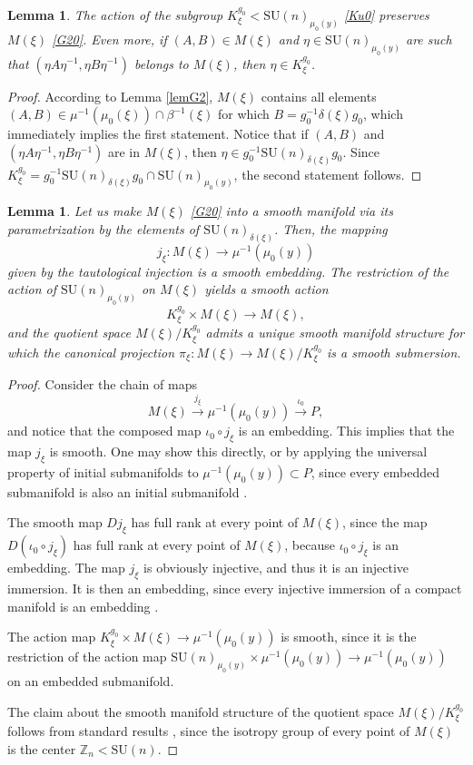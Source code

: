\documentclass[a4paper,11pt,reqno]{amsart}
\newtheorem{lem}[thm]{Lemma}
\theoremstyle{definition}
\numberwithin{equation}{section}
\newcommand{\be}{\begin{equation}}
\newcommand{\ee}{\end{equation}}
\def\bZ{{\mathbb Z}}                        %
\def\SU{\mathrm{SU}}                        %
\begin{document}
\begin{lem}\label{lemG8}
The action of the subgroup $K^{g_0}_\xi < \SU(n)_{\mu_0(y)}$ \eqref{Ku0} preserves $M(\xi)$ \eqref{G20}.
Even more, if $(A,B)\in M(\xi)$ and $\eta \in \SU(n)_{\mu_0(y)}$  are such that
$(\eta A \eta^{-1}, \eta B \eta^{-1})$ belongs to $M(\xi)$, then $\eta\in  K^{g_0}_\xi$.
\end{lem}
\begin{proof}
According to Lemma \ref{lemG2}, $M(\xi)$ contains all elements $(A,B) \in \mu^{-1} (\mu_0(\xi)) \cap \beta^{-1}(\xi)$
for which $B = g_0^{-1} \delta(\xi) g_0$, which immediately implies the first statement.
Notice that if $(A,B)$ and $ (\eta A\eta^{-1} ,\eta  B \eta^{-1})$ are in  $M(\xi)$,
then $\eta \in g_0^{-1} \SU(n)_{\delta(\xi)} g_0$.
Since $K_\xi^{g_0} = g_0^{-1} \SU(n)_{\delta (\xi)} g_0 \cap  \SU(n)_{\mu_0(y)}$, the second statement follows.
\end{proof}


\begin{lem}
Let us make $M(\xi)$ \eqref{G20} into a smooth manifold via its parametrization by the elements of $\SU(n)_{\delta(\xi)}$.
Then, the mapping
\be
j_\xi: M(\xi) \to \mu^{-1}(\mu_0(y))
\label{B4}\ee
given by the tautological injection is a smooth embedding. The restriction of the action of $\SU(n)_{\mu_0(y)}$ on $M(\xi)$
yields  a smooth action
\be
K_\xi^{g_0} \times M(\xi) \to M(\xi),
\label{B7}\ee
and the quotient space
$M(\xi)/K_\xi^{g_0}$ admits a unique smooth manifold structure for which the canonical projection
$\pi_\xi: M(\xi) \to M(\xi)/K_\xi^{g_0}$ is a smooth submersion.
\end{lem}
\begin{proof}
Consider the chain of maps
\be
M(\xi) \overset{j_\xi}{\longrightarrow} \mu^{-1}(\mu_0(y)) \overset{\iota_0}{\longrightarrow} P,
\label{B5}\ee
and notice that the composed map $\iota_0 \circ j_\xi$ is an embedding.
This implies that the map $j_\xi$ is smooth.
One may show this directly, or by applying the universal property of initial submanifolds to $\mu^{-1}(\mu_0(y)) \subset P$,
 since every embedded submanifold is also an initial  submanifold \cite{OR}.

The smooth map $D j_\xi$ has full rank at every point of $M(\xi)$, since the map $D (\iota_0 \circ j_\xi)$ has full rank
at every point of $M(\xi)$,  because $\iota_0 \circ j_\xi$ is an embedding.
The map $j_\xi$ is obviously injective, and thus it is an injective immersion.
It is then an embedding, since every injective immersion of a compact manifold is an embedding \cite{L}.

The action map $K_\xi^{g_0} \times M(\xi) \to \mu^{-1}(\mu_0(y))$ is smooth, since it is the
restriction of the action map $\SU(n)_{\mu_0(y)} \times \mu^{-1}(\mu_0(y)) \to \mu^{-1}(\mu_0(y))$ on an embedded submanifold.

The claim about the smooth manifold structure of the quotient space $M(\xi)/K_\xi^{g_0}$ follows from standard results \cite{L,OR},
since the isotropy group of every point of $M(\xi)$ is the center $\bZ_n < \SU(n)$.
\end{proof}
\end{document}
